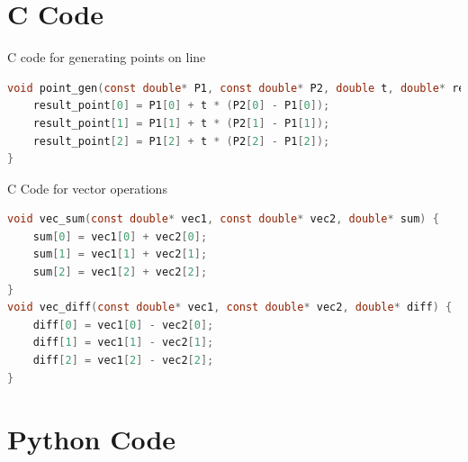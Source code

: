 \documentclass{beamer}
\theoremstyle{remark}
\numberwithin{equation}{section}
\begin{document}
\section{C Code}
\begin{frame}[fragile]{C code for generating points on line}
\begin{lstlisting}[language=C]
 void point_gen(const double* P1, const double* P2, double t, double* result_point) {
    result_point[0] = P1[0] + t * (P2[0] - P1[0]);
    result_point[1] = P1[1] + t * (P2[1] - P1[1]);
    result_point[2] = P1[2] + t * (P2[2] - P1[2]);
}
\end{lstlisting}
\end{frame}
\begin{frame}[fragile]{C Code for vector operations}
 \begin{lstlisting}[language=C]
  void vec_sum(const double* vec1, const double* vec2, double* sum) {
    sum[0] = vec1[0] + vec2[0];
    sum[1] = vec1[1] + vec2[1];
    sum[2] = vec1[2] + vec2[2];
}
void vec_diff(const double* vec1, const double* vec2, double* diff) {
    diff[0] = vec1[0] - vec2[0];
    diff[1] = vec1[1] - vec2[1];
    diff[2] = vec1[2] - vec2[2];
}
 \end{lstlisting}
\end{frame}
\section{Python Code}
\end{document}
